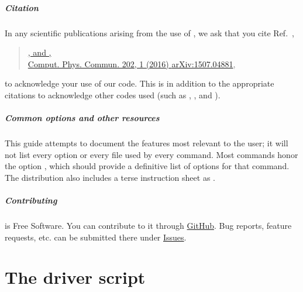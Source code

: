 \paragraph{Citation} In any scientific publications arising from the
use of \woptic, we ask that you cite Ref.~\cite{woptic},
%
\begin{quote}
  \href{http://www.sciencedirect.com/science/article/pii/S0010465515004488}{
    , and
    ,\\
    Comput. Phys. Commun. 202, 1 (2016)
  }
  \href{http://arxiv.org/abs/1507.04881}{arXiv:1507.04881},
\end{quote}
%
to acknowledge your use of our code.  This is in addition to the
appropriate citations to acknowledge other codes used (such as \wien
\cite{wien2k}, \wannier \cite{wien2wannier}, and \wtow
\cite{wannier90}).

\paragraph{Common options and other resources} This guide attempts to
document the features most relevant to the \woptic user; it will not
list every option or every file used by every command.  Most commands
honor the option , which should provide a definitive
list of options for that command.  The \woptic distribution also
includes a terse instruction sheet as .

\paragraph{Contributing} \Woptic is Free Software.  You can contribute
to it through \href{https://github.com/woptic/woptic}{GitHub}.  Bug
reports, feature requests, etc. can be submitted there under
\href{https://github.com/woptic/woptic/issues}{Issues}.

\MyTOC

\mainmatter


\chapter{The driver script \woprogHd}
\label{sec:woprog}


